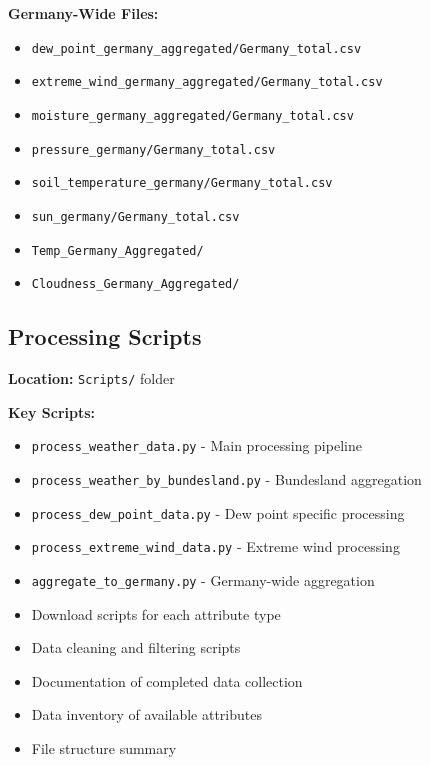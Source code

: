 \documentclass[11pt,a4paper]{article}
\begin{document}
\textbf{Germany-Wide Files:}
\begin{itemize}
    \item \texttt{dew\_point\_germany\_aggregated/Germany\_total.csv}
    \item \texttt{extreme\_wind\_germany\_aggregated/Germany\_total.csv}
    \item \texttt{moisture\_germany\_aggregated/Germany\_total.csv}
    \item \texttt{pressure\_germany/Germany\_total.csv}
    \item \texttt{soil\_temperature\_germany/Germany\_total.csv}
    \item \texttt{sun\_germany/Germany\_total.csv}
    \item \texttt{Temp\_Germany\_Aggregated/}
    \item \texttt{Cloudness\_Germany\_Aggregated/}
\end{itemize}

    \subsection{Processing Scripts}

\textbf{Location:} \texttt{Scripts/} folder

\textbf{Key Scripts:}
\begin{itemize}
    \item \texttt{process\_weather\_data.py} - Main processing pipeline
    \item \texttt{process\_weather\_by\_bundesland.py} - Bundesland aggregation
    \item \texttt{process\_dew\_point\_data.py} - Dew point specific processing
    \item \texttt{process\_extreme\_wind\_data.py} - Extreme wind processing
    \item \texttt{aggregate\_to\_germany.py} - Germany-wide aggregation
    \item Download scripts for each attribute type
    \item Data cleaning and filtering scripts
\end{itemize}

\begin{deliverablebox}
\begin{itemize}
    \item Documentation of completed data collection
    \item Data inventory of available attributes
    \item File structure summary
\end{itemize}
\end{deliverablebox}
\end{document}
